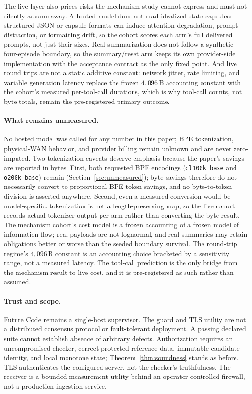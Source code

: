 The live layer also prices risks the mechanism study cannot express
and must not silently assume away. A hosted model does not read
idealized state capsules: structured JSON or capsule formats can
induce attention degradation, prompt distraction, or formatting drift,
so the cohort scores each arm's full delivered prompts, not just their
sizes. Real summarization does not follow a synthetic four-episode
boundary, so the summary/reset arm keeps its own provider-side
implementation with the acceptance contract as the only fixed point.
And live round trips are not a static additive constant: network
jitter, rate limiting, and variable generation latency replace the
frozen $4{,}096$\,B accounting constant with the cohort's measured
per-tool-call durations, which is why tool-call counts, not byte
totals, remain the pre-registered primary outcome.

\paragraph{What remains unmeasured.}
No hosted model was called for any number in this paper; BPE
tokenization, physical-WAN behavior, and provider billing remain
unknown and are never zero-imputed. Two tokenization caveats deserve
emphasis because the paper's savings are reported in bytes. First,
both requested BPE encodings (\texttt{cl100k\_base} and
\texttt{o200k\_base}) remain \UNKNOWN{}
(Section~\ref{sec:unmeasured}); byte savings therefore do not
necessarily convert to proportional BPE token savings, and no
byte-to-token division is asserted anywhere. Second, even a measured
conversion would be model-specific: tokenization is not a
length-preserving map, so the live cohort records actual tokenizer
output per arm rather than converting the byte result. The mechanism cohort's cost model
is a frozen accounting of a frozen model of information flow; real
payloads are not lognormal, and real summaries may retain obligations
better or worse than the seeded boundary survival. The round-trip
regime's $4{,}096$\,B constant is an accounting choice bracketed by a
sensitivity range, not a measured latency. The tool-call prediction
is the only bridge from the mechanism result to live cost, and it is
pre-registered as such rather than assumed.

\paragraph{Trust and scope.}
Future Code remains a single-host supervisor. The guard and TLS
utility are not a distributed consensus protocol or fault-tolerant
deployment. A passing declared suite cannot establish absence of
arbitrary defects. Authorization requires an uncompromised checker,
correct protected reference data, immutable candidate identity, and
local monotone state; Theorem~\ref{thm:soundness} stands as before.
TLS authenticates the configured server, not the checker's
truthfulness. The receiver is a bounded measurement utility behind an
operator-controlled firewall, not a production ingestion service.
